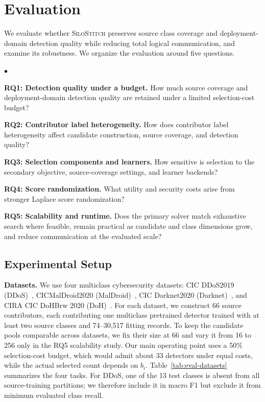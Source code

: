 \documentclass[conference]{IEEEtran}
\theoremstyle{definition}
\newcommand{\Fname}{\textsc{SiloStitch}\xspace}
\newcommand{\bheading}[1]{\noindent\textbf{#1.}\xspace}
\newenvironment{packeditemize}{
\begin{list}{$\bullet$}{
\setlength{\labelwidth}{8pt}
\setlength{\itemsep}{0pt}
\setlength{\leftmargin}{\labelwidth}
\addtolength{\leftmargin}{\labelsep}
\setlength{\parindent}{0pt}
\setlength{\listparindent}{\parindent}
\setlength{\parsep}{0pt}
\setlength{\topsep}{3pt}}}{\end{list}}
\begin{document}
\section{Evaluation}
\label{sec:experiments}

We evaluate whether \Fname preserves source class coverage and deployment-domain detection quality while reducing total logical communication, and examine its robustness.
We organize the evaluation around five questions.
\begin{packeditemize}
    \item \textbf{RQ1: Detection quality under a budget.}
    How much source coverage and deployment-domain detection quality are retained under a limited selection-cost budget?

    \item \textbf{RQ2: Contributor label heterogeneity.}
    How does contributor label heterogeneity affect candidate construction, source coverage, and detection quality?

    \item \textbf{RQ3: Selection components and learners.}
    How sensitive is selection to the secondary objective, source-coverage settings, and learner backends?

    \item \textbf{RQ4: Score randomization.}
    What utility and security costs arise from stronger Laplace score randomization?

    \item \textbf{RQ5: Scalability and runtime.}
    Does the primary solver match exhaustive search where feasible, remain practical as candidate and class dimensions grow, and reduce communication at the evaluated scale?
\end{packeditemize}

\subsection{Experimental Setup}

\bheading{Datasets}
We use four multiclass cybersecurity datasets: CIC DDoS2019 (DDoS)~\cite{cicddos19}, CICMalDroid2020 (MalDroid)~\cite{maldroid}, CIC Darknet2020 (Darknet)~\cite{darknet}, and CIRA CIC DoHBrw 2020 (DoH)~\cite{DoH}.
For each dataset, we construct 66 source contributors, each contributing one multiclass pretrained detector trained with at least two source classes and 74--30,517 fitting records.
To keep the candidate pools comparable across datasets, we fix their size at 66 and vary it from 16 to 256 only in the RQ5 scalability study.
Our main operating point uses a 50\% selection-cost budget, which would admit about 33 detectors under equal costs, while the actual selected count depends on $b_i$.
Table~\ref{tab:eval-datasets} summarizes the four tasks.
For DDoS, one of the 13 test classes is absent from all source-training partitions; we therefore include it in macro F1 but exclude it from minimum evaluated class recall.
\end{document}
